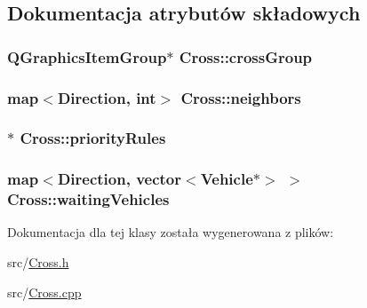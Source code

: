 \subsection{Dokumentacja atrybutów składowych}
\hypertarget{class_cross_a62b3a18fc6fa317d516846efe454b8ae}{
\subsubsection[{cross\-Group}]{\setlength{\rightskip}{0pt plus 5cm}Q\-Graphics\-Item\-Group$\ast$ Cross\-::cross\-Group}}\label{class_cross_a62b3a18fc6fa317d516846efe454b8ae}
\hypertarget{class_cross_af931388763664ba4224f054b6a42fea2}{
\subsubsection[{neighbors}]{\setlength{\rightskip}{0pt plus 5cm}map$<${\bf Direction}, int$>$ Cross\-::neighbors\hspace{0.3cm}{\ttfamily [private]}}}\label{class_cross_af931388763664ba4224f054b6a42fea2}
\hypertarget{class_cross_a46a8edfbb4172a050ceeba58db6c30bb}{
\subsubsection[{priority\-Rules}]{$\ast$ Cross\-::priority\-Rules\hspace{0.3cm}{\ttfamily [private]}}}\label{class_cross_a46a8edfbb4172a050ceeba58db6c30bb}
\hypertarget{class_cross_aa6994973a6c8e4d0478410dbeb47d3b4}{
\subsubsection[{waiting\-Vehicles}]{\setlength{\rightskip}{0pt plus 5cm}map$<${\bf Direction}, vector$<${\bf Vehicle}$\ast$$>$ $>$ Cross\-::waiting\-Vehicles\hspace{0.3cm}{\ttfamily [private]}}}\label{class_cross_aa6994973a6c8e4d0478410dbeb47d3b4}


Dokumentacja dla tej klasy została wygenerowana z plików\-:\begin{DoxyCompactItemize}
\item 
src/\hyperlink{_cross_8h}{Cross.\-h}\item 
src/\hyperlink{_cross_8cpp}{Cross.\-cpp}\end{DoxyCompactItemize}
